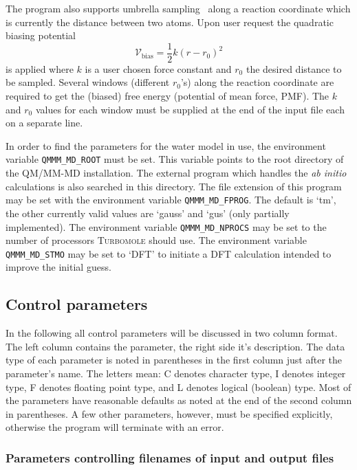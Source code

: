 \documentclass[12pt,a4paper]{article}
\newcommand{\Code}[1]{\texttt{#1}}
\newcommand{\Latin}[1]{\textit{#1}}
\newcommand{\Program}[1]{\textsc{#1}}
\begin{document}
The program also supports umbrella sampling~\cite{Torrie:ChemPhysLett-28-578,%
  Roux:CompPhysComm-91-275} along a reaction coordinate which is currently the
distance between two atoms.  Upon user request the quadratic biasing potential
\begin{equation}
  \label{eq:umbrella}
  \mathscr{V}_{\text{bias}} = \frac{1}{2} k (r - r_0)^2
\end{equation}
is applied where $k$ is a user chosen force constant and $r_0$ the desired
distance to be sampled.  Several windows (different $r_0$'s) along the reaction
coordinate are required to get the (biased) free energy (potential of mean
force, PMF).  The $k$ and $r_0$ values for each window must be supplied at the
end of the input file each on a separate line.

In order to find the parameters for the water model in use, the environment
variable \Code{QMMM\_MD\_ROOT} must be set.  This variable points to the root
directory of the QM/MM-MD installation.  The external program which handles the
\Latin{ab initio} calculations is also searched in this directory.  The file
extension of this program may be set with the environment variable
\Code{QMMM\_MD\_FPROG}.  The default is `tm', the other currently valid values
are `gauss' and `gus' (only partially implemented).  The environment variable
\Code{QMMM\_MD\_NPROCS} may be set to the number of processors
\Program{Turbomole} should use.  The environment variable \Code{QMMM\_MD\_STMO}
may be set to `DFT' to initiate a DFT calculation intended to improve the
initial guess.


\subsection*{Control parameters}

In the following all control parameters will be discussed in two column format.
The left column contains the parameter, the right side it's description.  The
data type of each parameter is noted in parentheses in the first column just
after the parameter's name.  The letters mean: C denotes character type, I
denotes integer type, F denotes floating point type, and L denotes logical
(boolean) type.  Most of the parameters have reasonable defaults as noted at
the end of the second column in parentheses.  A few other parameters, however,
must be specified explicitly, otherwise the program will terminate with an
error.

\subsubsection*{Parameters controlling filenames of input and output files}
\end{document}
